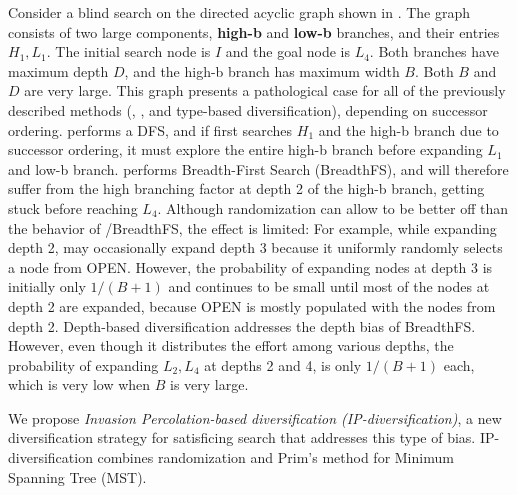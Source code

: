 Consider a blind search on the directed acyclic graph
shown in .
The graph consists of two large components, \textbf{high-b} and \textbf{low-b} branches, and their entries $H_1,L_1$. The initial search node is $I$ and the goal node is $L_4$.
Both branches have maximum depth $D$, and the high-b branch has maximum width $B$.
Both $B$ and $D$ are very large.
This graph presents a pathological case for all of the previously described methods (\lifo, \fifo, \ro and type-based diversification), depending on successor ordering.
\lifo performs a DFS, and if \lifo first searches $H_1$ and the high-b branch due to successor ordering, it must explore the entire high-b branch before expanding $L_1$ and low-b branch.
\fifo performs Breadth-First Search (BreadthFS), and  will therefore suffer from the  high branching factor at depth 2 of the high-b branch, getting stuck before reaching $L_4$.
Although randomization can allow \ro to be better off than the behavior of \fifo/BreadthFS, the effect is limited:
For example, while expanding depth 2, \ro may occasionally expand depth 3 because it uniformly randomly selects a node from OPEN.
However, the probability of expanding nodes at depth 3 is initially only $1/(B+1)$ and continues to be small until  most of the nodes at depth 2 are expanded, 
because OPEN is mostly populated with the nodes from depth 2.
Depth-based diversification addresses the depth bias of BreadthFS.
However, even though it distributes the effort among various depths,
the probability of expanding $L_2,L_4$ at depths 2 and 4, is only $1/(B+1)$ each, which is very low when $B$ is very large.

We propose \;\emph{Invasion Percolation-based diversification (IP-diversification)}, a new diversification strategy for satisficing search that addresses this type of bias.
IP-diversification combines randomization and Prim's method \cite{prim1957shortest} for Minimum Spanning Tree (MST).
